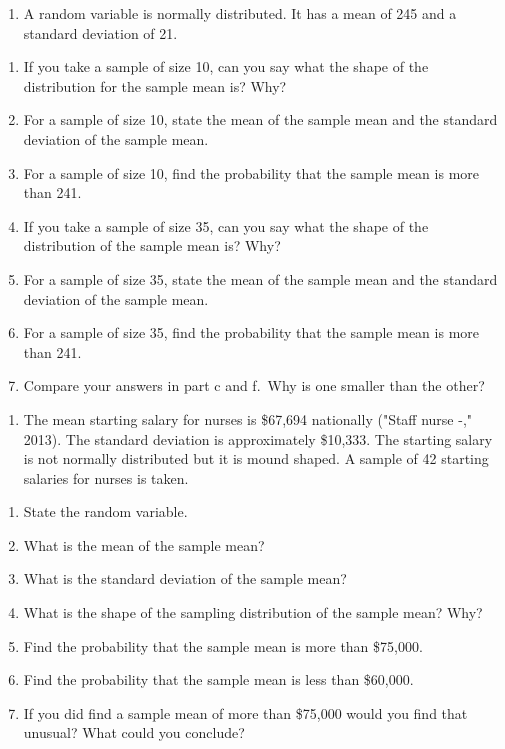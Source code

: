 \documentclass[
]{book}
\providecommand{\tightlist}{%
  \setlength{\itemsep}{0pt}\setlength{\parskip}{0pt}}
\begin{document}
\begin{enumerate}
\def\labelenumi{\arabic{enumi}.}
\setcounter{enumi}{1}
\tightlist
\item
  A random variable is normally distributed. It has a mean of 245 and a standard deviation of 21.
\end{enumerate}

\begin{enumerate}
\def\labelenumi{\alph{enumi}.}
\tightlist
\item
  If you take a sample of size 10, can you say what the shape of the distribution for the sample mean is? Why?
\item
  For a sample of size 10, state the mean of the sample mean and the standard deviation of the sample mean.
\item
  For a sample of size 10, find the probability that the sample mean is more than 241.
\item
  If you take a sample of size 35, can you say what the shape of the distribution of the sample mean is? Why?
\item
  For a sample of size 35, state the mean of the sample mean and the standard deviation of the sample mean.
\item
  For a sample of size 35, find the probability that the sample mean is more than 241.
\item
  Compare your answers in part c and f.~Why is one smaller than the other?
\end{enumerate}

\begin{enumerate}
\def\labelenumi{\arabic{enumi}.}
\setcounter{enumi}{2}
\tightlist
\item
  The mean starting salary for nurses is \$67,694 nationally ("Staff nurse -," 2013). The standard deviation is approximately \$10,333. The starting salary is not normally distributed but it is mound shaped. A sample of 42 starting salaries for nurses is taken.
\end{enumerate}

\begin{enumerate}
\def\labelenumi{\alph{enumi}.}
\tightlist
\item
  State the random variable.
\item
  What is the mean of the sample mean?
\item
  What is the standard deviation of the sample mean?
\item
  What is the shape of the sampling distribution of the sample mean? Why?
\item
  Find the probability that the sample mean is more than \$75,000.
\item
  Find the probability that the sample mean is less than \$60,000.
\item
  If you did find a sample mean of more than \$75,000 would you find that unusual? What could you conclude?
\end{enumerate}
\end{document}
